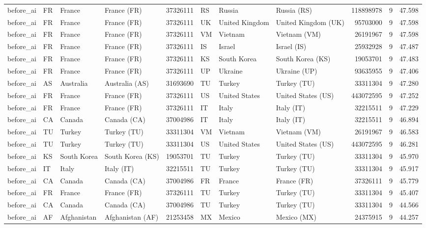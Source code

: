 \begin{tabular}{llllrlllrrr}
before\_ai & FR & France & France (FR) & 37326111 & RS & Russia & Russia (RS) & 118898978 & 9 & 47.598 \\
before\_ai & FR & France & France (FR) & 37326111 & UK & United Kingdom & United Kingdom (UK) & 95703000 & 9 & 47.598 \\
before\_ai & FR & France & France (FR) & 37326111 & VM & Vietnam & Vietnam (VM) & 26191967 & 9 & 47.598 \\
before\_ai & FR & France & France (FR) & 37326111 & IS & Israel & Israel (IS) & 25932928 & 9 & 47.487 \\
before\_ai & FR & France & France (FR) & 37326111 & KS & South Korea & South Korea (KS) & 19053701 & 9 & 47.483 \\
before\_ai & FR & France & France (FR) & 37326111 & UP & Ukraine & Ukraine (UP) & 93635955 & 9 & 47.406 \\
before\_ai & AS & Australia & Australia (AS) & 31693690 & TU & Turkey & Turkey (TU) & 33311304 & 9 & 47.280 \\
before\_ai & FR & France & France (FR) & 37326111 & US & United States & United States (US) & 443072595 & 9 & 47.252 \\
before\_ai & FR & France & France (FR) & 37326111 & IT & Italy & Italy (IT) & 32215511 & 9 & 47.229 \\
before\_ai & CA & Canada & Canada (CA) & 37004986 & IT & Italy & Italy (IT) & 32215511 & 9 & 46.894 \\
before\_ai & TU & Turkey & Turkey (TU) & 33311304 & VM & Vietnam & Vietnam (VM) & 26191967 & 9 & 46.583 \\
before\_ai & TU & Turkey & Turkey (TU) & 33311304 & US & United States & United States (US) & 443072595 & 9 & 46.281 \\
before\_ai & KS & South Korea & South Korea (KS) & 19053701 & TU & Turkey & Turkey (TU) & 33311304 & 9 & 45.970 \\
before\_ai & IT & Italy & Italy (IT) & 32215511 & TU & Turkey & Turkey (TU) & 33311304 & 9 & 45.917 \\
before\_ai & CA & Canada & Canada (CA) & 37004986 & FR & France & France (FR) & 37326111 & 9 & 45.779 \\
before\_ai & FR & France & France (FR) & 37326111 & TU & Turkey & Turkey (TU) & 33311304 & 9 & 45.407 \\
before\_ai & CA & Canada & Canada (CA) & 37004986 & TU & Turkey & Turkey (TU) & 33311304 & 9 & 44.566 \\
before\_ai & AF & Afghanistan & Afghanistan (AF) & 21253458 & MX & Mexico & Mexico (MX) & 24375915 & 9 & 44.257 \\

\end{tabular}
